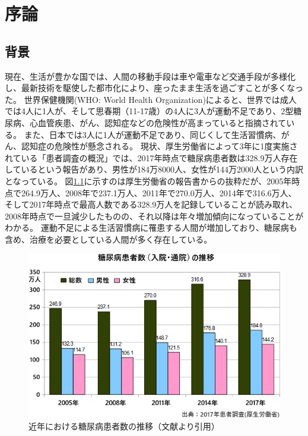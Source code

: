 \chapter{序論}
\label{chap:introduction}

\section{背景}
\label{section:background}
現在、生活が豊かな国では、人間の移動手段は車や電車など交通手段が多様化し、最新技術を駆使した都市化により、座ったまま生活を過ごすことが多くなった。
世界保健機関(WHO: World Health Organization)によると、世界では成人では4人に1人が、そして思春期（11-17歳）の4人に3人が運動不足であり、2型糖尿病、心血管疾患、がん、認知症などの危険性が高まっていると指摘されている。\cite{who_gappa_report_jp}
また、日本では3人に1人が運動不足であり、同じくして生活習慣病、がん、認知症の危険性が懸念される。\cite{obesity_report}
現状、厚生労働省によって3年に1度実施されている「患者調査の概況」では、2017年時点で糖尿病患者数は328.9万人存在しているという報告があり、男性が184万8000人、女性が144万2000人という内訳となっている。\cite{diabetes_statistics}
図\ref{fig:diabetes_total_number}に示すのは厚生労働省の報告書からの抜粋だが、2005年時点で264.9万人、2008年で237.1万人、2011年で270.0万人、2014年で316.6万人、そして2017年時点で最高人数である328.9万人を記録していることが読み取れ、2008年時点で一旦減少したものの、それ以降は年々増加傾向になっていることがわかる。
運動不足による生活習慣病に罹患する人間が増加しており、糖尿病も含め、治療を必要としている人間が多く存在している。

\begin{figure}[htbp]
  \caption{近年における糖尿病患者数の推移（文献\cite{diabetes_statistics}より引用）}
  \label{fig:diabetes_total_number}
  \begin{center}
    \includegraphics[bb=0 0 600 400,width=15cm]{assets/diabetes_total_number.png}
  \end{center}
\end{figure}

